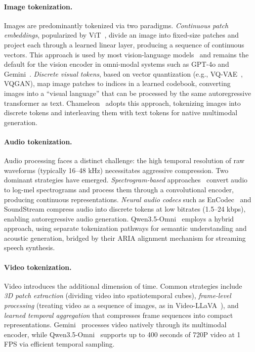 \documentclass{article}
\begin{document}
\paragraph{Image tokenization.}
Images are predominantly tokenized via two paradigms.
\emph{Continuous patch embeddings}, popularized by ViT~\cite{dosovitskiy2021vit}, divide an image into fixed-size patches and project each through a learned linear layer, producing a sequence of continuous vectors.
This approach is used by most vision-language models~\cite{liu2024llava,li2023blip2} and remains the default for the vision encoder in omni-modal systems such as GPT-4o and Gemini~\cite{google2024gemini}.
\emph{Discrete visual tokens}, based on vector quantization (e.g., VQ-VAE~\cite{van2017vqvae}, VQGAN), map image patches to indices in a learned codebook, converting images into a ``visual language'' that can be processed by the same autoregressive transformer as text.
Chameleon~\cite{jiang2024chameleon} adopts this approach, tokenizing images into discrete tokens and interleaving them with text tokens for native multimodal generation.

\paragraph{Audio tokenization.}
Audio processing faces a distinct challenge: the high temporal resolution of raw waveforms (typically 16--48 kHz) necessitates aggressive compression.
Two dominant strategies have emerged.
\emph{Spectrogram-based} approaches~\cite{radford2023whisper} convert audio to log-mel spectrograms and process them through a convolutional encoder, producing continuous representations.
\emph{Neural audio codecs} such as EnCodec~\cite{defossez2022encodec} and SoundStream compress audio into discrete tokens at low bitrates (1.5--24 kbps), enabling autoregressive audio generation.
Qwen3.5-Omni~\cite{qwen2026omni} employs a hybrid approach, using separate tokenization pathways for semantic understanding and acoustic generation, bridged by their ARIA alignment mechanism for streaming speech synthesis.

\paragraph{Video tokenization.}
Video introduces the additional dimension of time.
Common strategies include \emph{3D patch extraction} (dividing video into spatiotemporal cubes), \emph{frame-level processing} (treating video as a sequence of images, as in Video-LLaVA~\cite{lin2023videollava}), and \emph{learned temporal aggregation} that compresses frame sequences into compact representations.
Gemini~\cite{google2024gemini} processes video natively through its multimodal encoder, while Qwen3.5-Omni~\cite{qwen2026omni} supports up to 400 seconds of 720P video at 1 FPS via efficient temporal sampling.
\end{document}
